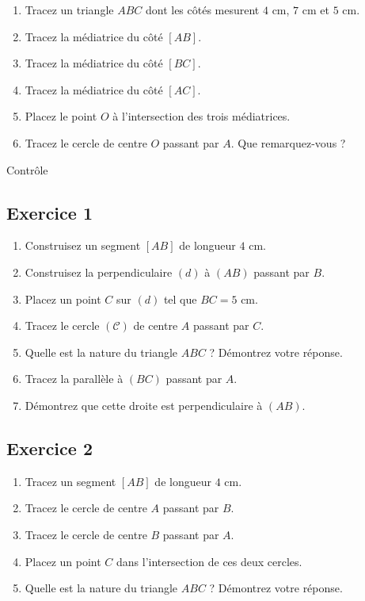 \documentclass[12 pt]{extarticle}
\theoremstyle{plain}
\begin{document}
 \begin{enumerate}
 \item Tracez un triangle $ABC$ dont les côtés mesurent $4$ cm, $7$ cm et $5$ cm. 
 \item Tracez la médiatrice du côté $[AB]$. 
 \item Tracez la médiatrice du côté $[BC]$. 
 \item Tracez la médiatrice du côté $[AC]$. 
 \item Placez le point $O$ à l'intersection des trois médiatrices. 
 \item Tracez le cercle de centre $O$ passant par $A$. Que remarquez-vous ? \end{enumerate}
 

\newpage

\begin{center}{\Large Contrôle}\\ 
 \end{center}
 
 \subsection*{Exercice 1}
 \begin{enumerate}
 \item Construisez un segment $[AB]$ de longueur $4$ cm. 
 
 
 \item Construisez la perpendiculaire $(d)$ à $(AB)$ passant par $B$.  
 \item Placez un point $C$ sur $(d)$ tel que $BC=5$ cm. 
	
 \item Tracez le cercle $(\mathcal C)$ de centre $A$ passant par $C$.
 
 \item Quelle est la nature du triangle $ABC$ ? Démontrez votre réponse. 
 
 \item Tracez la parallèle à $(BC)$ passant par $A$. 
 
 \item Démontrez que cette droite est perpendiculaire à $(AB)$. 
 
 
 \end{enumerate}
 \subsection*{Exercice 2}
 
 \begin{enumerate}
 \item Tracez un segment $[AB]$ de longueur $4$ cm. 
 
 \item Tracez le cercle de centre $A$ passant par $B$. 
 
 \item Tracez le cercle de centre $B$ passant par $A$. 
 
 \item Placez un point $C$ dans l'intersection de ces deux cercles. 
 
 \item Quelle est la nature du triangle $ABC$ ? Démontrez votre réponse. 
 \end{enumerate}
 
\end{document}
